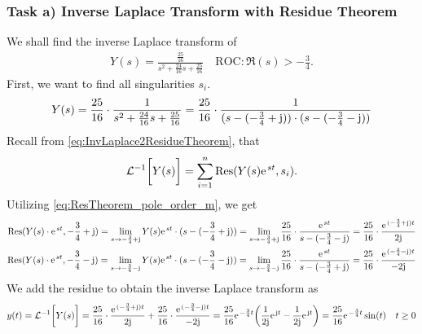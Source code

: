 \documentclass[11pt,a4paper,DIV=12]{scrartcl}
\begin{document}
\subsubsection{Task a) Inverse Laplace Transform with Residue Theorem}
We shall find the inverse Laplace transform of
\begin{align}
	Y(s)=\frac{\frac{25}{16}}{s^2+\frac{24}{16}s+\frac{25}{16}}
\quad \text{ROC}: \Re(s) > -\frac{3}{4}
	. \nonumber
\end{align}
First, we want to find all singularities $s_i$.
\begin{align}
	Y(s)=\frac{25}{16}\cdot\frac{1}{s^2+\frac{24}{16}s+\frac{25}{16}}=\frac{25}{16}\cdot \frac{1}{(s-(-\frac{3}{4}+\im))\cdot(s-(-\frac{3}{4}-\im))}
\end{align}
Recall from \eqref{eq:InvLaplace2ResidueTheorem}, that
\begin{align}
	\mathcal{L}^{-1}\bigg [Y(s)\bigg ] = \sum_{i=1}^{n}\mathrm{Res}(Y(s)\e^{st},s_i). \nonumber
\end{align}
Utilizing \eqref{eq:ResTheorem_pole_order_m}, we get
\begin{align}
	\mathrm{Res}(Y(s)\cdot\e^{st},-\frac{3}{4}+\im)=\lim\limits_{s\rightarrow-\frac{3}{4}+\im}Y(s)\e^{st}\cdot(s-(-\frac{3}{4}+\im))=\lim\limits_{s\rightarrow-\frac{3}{4}+\im}\frac{25}{16}\cdot\frac{\e^{st}}{s-(-\frac{3}{4}-\im)}=\frac{25}{16}\cdot\frac{\e^{(-\frac{3}{4}+\im) t}}{2\im} \nonumber \\
	\mathrm{Res}(Y(s)\cdot\e^{st},-\frac{3}{4}-\im)=\lim\limits_{s\rightarrow-\frac{3}{4}-\im}Y(s)\e^{st}\cdot(s-(-\frac{3}{4}-\im))=\lim\limits_{s\rightarrow-\frac{3}{4}-\im}\frac{25}{16}\cdot\frac{\e^{st}}{s-(-\frac{3}{4}+\im)}=\frac{25}{16}\cdot\frac{\e^{(-\frac{3}{4}-\im) t}}{-2\im}
\end{align}
We add the residue to obtain the inverse Laplace transform as
\begin{align}
	y(t)=\mathcal{L}^{-1}\bigg [ Y(s) \bigg ]= \frac{25}{16}\cdot\frac{\e^{(-\frac{3}{4}+\im)t}}{2\im}+\frac{25}{16}\cdot\frac{\e^{(-\frac{3}{4}-\im)t}}{-2\im} = \frac{25}{16}\e^{-\frac{3}{4}t}\bigg (\frac{1}{2\im}\e^{\im t}-\frac{1}{2\im}\e^{\im t} \bigg )=\frac{25}{16}\e^{-\frac{3}{4}t}\sin(t)\quad t\geq 0
\end{align}
\end{document}

